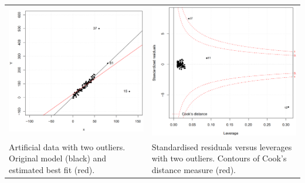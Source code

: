 \begin{table}[H]
  \setlength{\tabcolsep}{0.2em}
  \scriptsize
  \begin{tabular}{p{}@{\hskip 1em}p{}}
    \includegraphics[width=\linewidth]{Pics/10.2.3.png}& \includegraphics[width=\linewidth]{Pics/10.2.4.png} \\
    Artificial data with two outliers. Original model (black) and estimated best fit (red). &
    Standardised residuals versus leverages with two outliers. Contours of Cook’s distance measure (red).\\
  \end{tabular}
\end{table}

